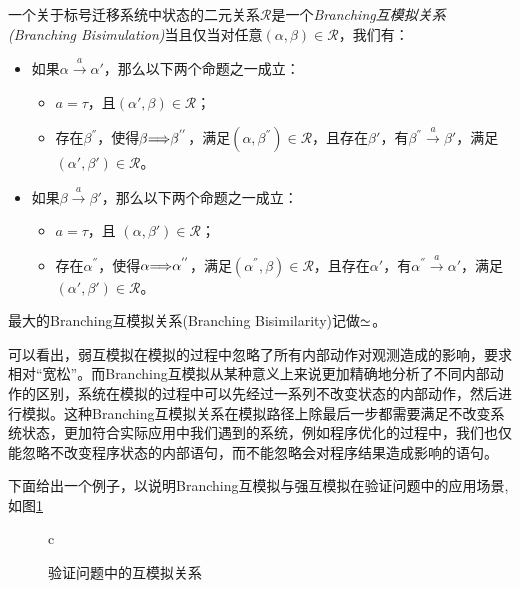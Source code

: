 \begin{defn}\label{def:bra-bis}
一个关于标号迁移系统中状态的二元关系$\mathcal{R}$是一个\emph{Branching互模拟关系(Branching Bisimulation)}当且仅当对任意$(\alpha,\beta)\in \mathcal{R}$，我们有：
\begin{itemize}
    \item 如果$\alpha\stackrel{a}{\longrightarrow}\alpha'$，那么以下两个命题之一成立：
    \begin{itemize}
        \item $a=\tau$，且$(\alpha',\beta)\in\mathcal{R}$；
        \item 存在$\beta^{''}$，使得$\beta{\stackrel{}{\Longrightarrow}}\beta^{''}$，满足$(\alpha,\beta^{''})\in\mathcal{R}$，且存在$\beta'$，有$\beta^{''}\stackrel{a}{\longrightarrow}\beta'$，满足$(\alpha',\beta')\in\mathcal{R}$。
    \end{itemize}
    \item 如果$\beta\stackrel{a}{\longrightarrow}\beta'$，那么以下两个命题之一成立：
    \begin{itemize}
        \item $a=\tau$，且 $(\alpha,\beta')\in\mathcal{R}$；
        \item 存在$\alpha^{''}$，使得$\alpha{\stackrel{}{\Longrightarrow}}\alpha^{''}$，满足$(\alpha^{''},\beta)\in\mathcal{R}$，且存在$\alpha'$，有$\alpha^{''}\stackrel{a}{\longrightarrow}\alpha'$，满足$(\alpha',\beta')\in\mathcal{R}$。
    \end{itemize}
\end{itemize}
最大的Branching互模拟关系(Branching Bisimilarity)记做$\simeq$。
\end{defn}

可以看出，弱互模拟在模拟的过程中忽略了所有内部动作对观测造成的影响，要求相对``宽松''。而Branching互模拟从某种意义上来说更加精确地分析了不同内部动作的区别，系统在模拟的过程中可以先经过一系列不改变状态的内部动作，然后进行模拟。这种Branching互模拟关系在模拟路径上除最后一步都需要满足不改变系统状态，更加符合实际应用中我们遇到的系统，例如程序优化的过程中，我们也仅能忽略不改变程序状态的内部语句，而不能忽略会对程序结果造成影响的语句。

下面给出一个例子，以说明Branching互模拟与强互模拟在验证问题中的应用场景,如图\ref{fig:bis-verif}

\begin{figure}[htbp]
\begin{center}
\begin{tabular}{c}
\end{tabular}
\end{center}
\caption{验证问题中的互模拟关系}
\label{fig:bis-verif}
\end{figure}

